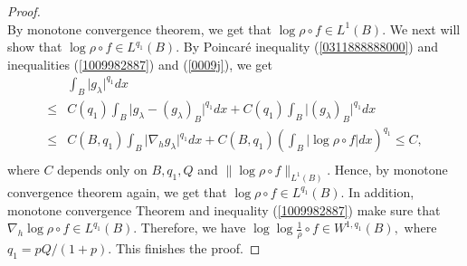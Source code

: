 \documentclass[10pt,a4paper]{amsart}
\begin{document}
\begin{proof}
\begin{equation}
  \end{equation}
By monotone convergence theorem, we get that $\log\rho\circ f\in L^{1}(B).$ We next will show that $\log\rho\circ f\in  L^{q_{1}}(B).$ By Poincar\'{e} inequality   (\ref{0311888888000})  and inequalities (\ref{1009982887}) and (\ref{0009j}), we get 
\begin{equation}
\begin{aligned}
&\int_{B}\vert g_{\lambda}\vert^{q_{1}}dx\\
\leq& C(q_{1})\int_{B}\vert g_{\lambda}-(g_{\lambda})_{B}\vert^{q_{1}}dx+C(q_{1})\int_{B}\vert(g_{\lambda})_{B}\vert^{q_{1}}dx\\
\leq& C(B,q_{1})\int_{B}\vert \nabla_{h}g_{\lambda}\vert^{q_{1}}dx+C(B,q_{1})\left(\int_{B} \vert\log\rho\circ f\vert dx\right)^{q_{1}}\leq C,\\
\end{aligned}
\end{equation}
where $C$ depends only on $B,q_{1},Q $ and $\| \log\rho\circ f\|_{L^{1}(B)}.$ Hence, by  monotone convergence theorem again, we get that $\log\rho\circ f\in L^{q_{1}}(B).$ In addition,  monotone convergence Theorem  and inequality (\ref{1009982887}) make sure that 
$\nabla_{h}\log\rho\circ f\in L^{q_{1}}(B).$ Therefore, we have $\log\log\frac{1}{\rho}\circ f\in W^{1,q_{1}}(B),$ where $q_{1}=pQ/(1+p).$ This finishes the proof. 
\end{proof}
\end{document}
